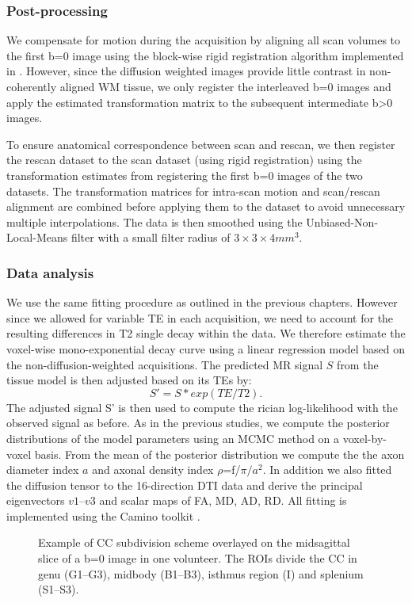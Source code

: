 \subsubsection*{Post-processing}
We compensate for motion during the acquisition by aligning all scan volumes to the first b=0 image using the block-wise rigid registration algorithm \citep{Ourselin:2001} implemented in \citep{Modat:2010}. However, since the diffusion weighted images provide little contrast in non-coherently aligned WM tissue, we only register the interleaved b=0 images and apply the estimated transformation matrix to the subsequent intermediate b>0 images.   

To ensure anatomical correspondence between scan and rescan, we then register the rescan dataset to the scan dataset (using rigid registration) using the transformation estimates from registering  the first b=0 images of the two datasets. The transformation matrices for intra-scan motion and scan/rescan alignment are combined before applying them to the dataset to avoid unnecessary multiple interpolations. The data is then smoothed using the Unbiased-Non-Local-Means filter \citep{Tristan-Vega:2012} with a small filter radius of $3\times3\times4 mm^3$.

\subsubsection*{Data analysis}
We use the same fitting procedure as outlined in the previous chapters. However since we allowed for variable TE in each acquisition, we need to account for the resulting differences in T2 single decay within the data. We therefore estimate the voxel-wise mono-exponential decay curve using a linear regression model based on the non-diffusion-weighted acquisitions. The predicted MR signal $S$ from the tissue model is then adjusted based on its \glspl{TE} by:
\begin{equation}
	S' = S * exp(TE/T2).
\end{equation}
The adjusted signal S' is then used to compute the rician log-likelihood with the observed signal as before. As in the previous studies, we compute the posterior distributions of the model parameters using an MCMC method on a voxel-by-voxel basis. From the mean of the posterior distribution we compute the the axon diameter index $a$ and axonal density index $\rho$=f/$\pi/a^2$. In addition we also fitted the diffusion tensor to the 16-direction DTI data and derive the principal eigenvectors $v1$--$v3$ and scalar maps of FA, MD, AD, RD. All fitting is implemented using the Camino toolkit \citep{Cook:2006}.
\begin{figure}[ht]
	\centering
	\caption{Example of CC subdivision scheme overlayed on the midsagittal slice of a b=0 image in one volunteer. The ROIs divide the CC in genu (G1--G3), midbody (B1--B3), isthmus region (I) and splenium (S1--S3).}
	\label{fig:chap9 CC ROIs}
\end{figure}
